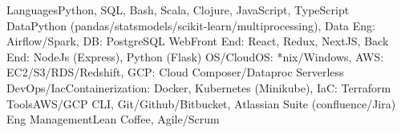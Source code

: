 \begin{additionals}
  \addional
    {Languages}{Python, SQL, Bash, Scala, Clojure, JavaScript, TypeScript}
  \addional
    {Data}{Python (pandas/statsmodels/scikit-learn/multiprocessing), Data Eng: Airflow/Spark, DB: PostgreSQL}
  \addional
    {Web}{Front End: React, Redux, NextJS, Back End: NodeJs (Express), Python (Flask)}
  \addional
    {OS/Cloud}{OS: *nix/Windows, AWS: EC2/S3/RDS/Redshift, GCP: Cloud Composer/Dataproc Serverless}
  \addional
    {DevOps/Iac}{Containerization: Docker, Kubernetes (Minikube), IaC: Terraform}
  \addional
    {Tools}{AWS/GCP CLI, Git/Github/Bitbucket, Atlassian Suite (confluence/Jira)}
  \addional
    {Eng Management}{Lean Coffee, Agile/Scrum}
\end{additionals}